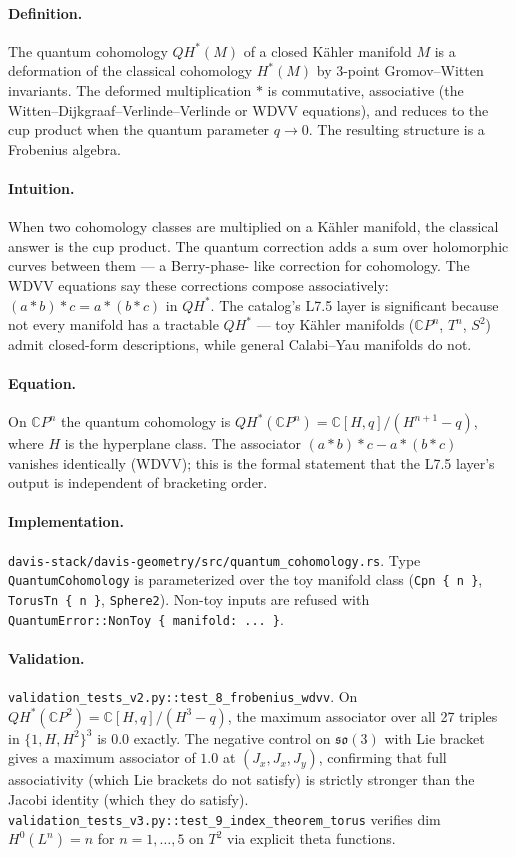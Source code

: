 \documentclass[11pt,letterpaper]{article}
\begin{document}
\paragraph{Definition.}
The quantum cohomology $QH^*(M)$ of a closed K\"ahler manifold $M$
is a deformation of the classical cohomology $H^*(M)$ by 3-point
Gromov--Witten invariants. The deformed multiplication $*$ is
commutative, associative (the Witten--Dijkgraaf--Verlinde--Verlinde
or WDVV equations), and reduces to the cup product when the
quantum parameter $q \to 0$. The resulting structure is a Frobenius
algebra.

\paragraph{Intuition.}
When two cohomology classes are multiplied on a K\"ahler manifold,
the classical answer is the cup product. The quantum correction
adds a sum over holomorphic curves between them --- a Berry-phase-
like correction for cohomology. The WDVV equations say these
corrections compose associatively: $(a * b) * c = a * (b * c)$ in
$QH^*$. The catalog's L7.5 layer is significant because not every
manifold has a tractable $QH^*$ --- toy K\"ahler manifolds
($\mathbb{C}P^n$, $T^n$, $S^2$) admit closed-form descriptions,
while general Calabi--Yau manifolds do not.

\paragraph{Equation.}
On $\mathbb{C}P^n$ the quantum cohomology is
$QH^*(\mathbb{C}P^n) = \mathbb{C}[H, q] / (H^{n+1} - q)$,
where $H$ is the hyperplane class. The associator
$(a * b) * c - a * (b * c)$ vanishes identically (WDVV); this is
the formal statement that the L7.5 layer's output is independent
of bracketing order.

\paragraph{Implementation.}
\texttt{davis-stack/davis-geometry/src/quantum\_cohomology.rs}.
Type \verb|QuantumCohomology| is parameterized over the toy
manifold class (\verb|Cpn { n }|, \verb|TorusTn { n }|,
\verb|Sphere2|). Non-toy inputs are refused with
\verb|QuantumError::NonToy { manifold: ... }|.

\paragraph{Validation.}
\texttt{validation\_tests\_v2.py::test\_8\_frobenius\_wdvv}. On
$QH^*(\mathbb{C}P^2) = \mathbb{C}[H, q] / (H^3 - q)$, the maximum
associator over all 27 triples in $\{1, H, H^2\}^3$ is $0.0$
exactly. The negative control on $\mathfrak{so}(3)$ with Lie
bracket gives a maximum associator of $1.0$ at $(J_x, J_x, J_y)$,
confirming that full associativity (which Lie brackets do not
satisfy) is strictly stronger than the Jacobi identity (which they
do satisfy). \texttt{validation\_tests\_v3.py::test\_9\_index\_theorem\_torus}
verifies dim $H^0(L^n) = n$ for $n = 1, \dots, 5$ on $T^2$ via
explicit theta functions.
\end{document}
